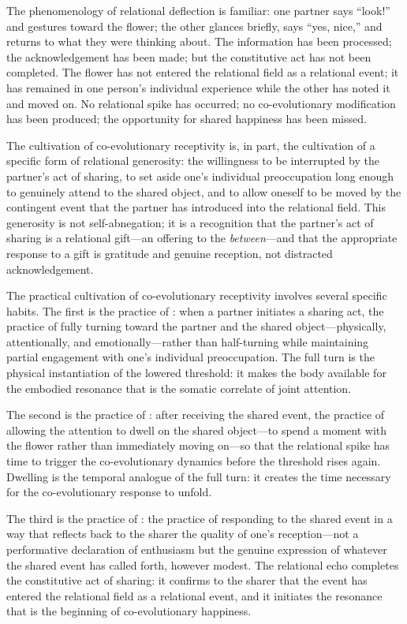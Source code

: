 The phenomenology of relational deflection is familiar: one partner says ``look!'' and gestures toward the flower; the other glances briefly, says ``yes, nice,'' and returns to what they were thinking about. The information has been processed; the acknowledgement has been made; but the constitutive act has not been completed. The flower has not entered the relational field as a relational event; it has remained in one person's individual experience while the other has noted it and moved on. No relational spike has occurred; no co-evolutionary modification has been produced; the opportunity for shared happiness has been missed.

The cultivation of co-evolutionary receptivity is, in part, the cultivation of a specific form of relational generosity: the willingness to be interrupted by the partner's act of sharing, to set aside one's individual preoccupation long enough to genuinely attend to the shared object, and to allow oneself to be moved by the contingent event that the partner has introduced into the relational field. This generosity is not self-abnegation; it is a recognition that the partner's act of sharing is a relational gift---an offering to the \emph{between}---and that the appropriate response to a gift is gratitude and genuine reception, not distracted acknowledgement.

The practical cultivation of co-evolutionary receptivity involves several specific habits. The first is the practice of : when a partner initiates a sharing act, the practice of fully turning toward the partner and the shared object---physically, attentionally, and emotionally---rather than half-turning while maintaining partial engagement with one's individual preoccupation. The full turn is the physical instantiation of the lowered threshold: it makes the body available for the embodied resonance that is the somatic correlate of joint attention.

The second is the practice of : after receiving the shared event, the practice of allowing the attention to dwell on the shared object---to spend a moment with the flower rather than immediately moving on---so that the relational spike has time to trigger the co-evolutionary dynamics before the threshold rises again. Dwelling is the temporal analogue of the full turn: it creates the time necessary for the co-evolutionary response to unfold.

The third is the practice of : the practice of responding to the shared event in a way that reflects back to the sharer the quality of one's reception---not a performative declaration of enthusiasm but the genuine expression of whatever the shared event has called forth, however modest. The relational echo completes the constitutive act of sharing: it confirms to the sharer that the event has entered the relational field as a relational event, and it initiates the resonance that is the beginning of co-evolutionary happiness.

